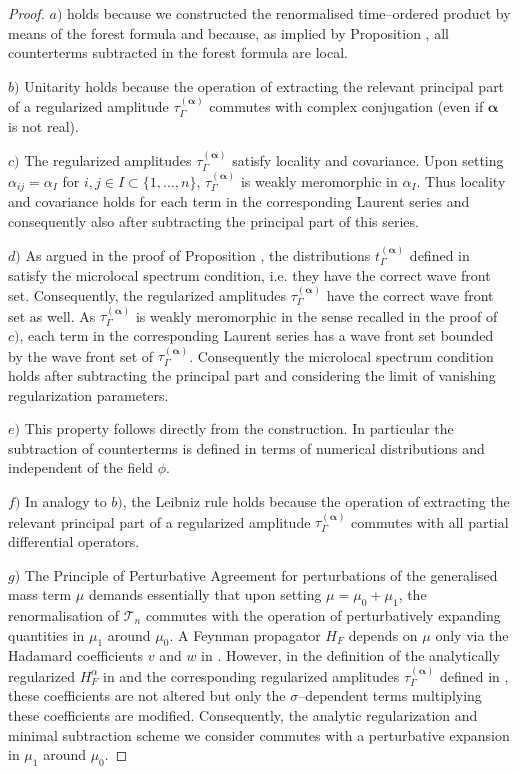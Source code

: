 \documentclass[11pt]{book}
\newcommand{\com}[1]{{\color{red}\bf #1}}
\newcommand{\alphabd}{\boldsymbol{\alpha}}
\theoremstyle{break}
\begin{document}
{\com{
\begin{proof}





$a)$ holds because we constructed the renormalised time--ordered product by means of the forest formula %
and because, as implied by Proposition %
, all counterterms subtracted in the forest formula are local.

$b)$ Unitarity holds because the operation of extracting the relevant principal part of a regularized amplitude $\tau^{(\alphabd)}_\Gamma$ commutes with complex conjugation (even if $\alphabd$ is not real).

$c)$ The regularized amplitudes $\tau^{(\alphabd)}_\Gamma$ satisfy locality and covariance. Upon setting $\alpha_{ij}=\alpha_I$ for $i,j\in I\subset \{1,\dots,n\}$, $\tau^{(\alphabd)}_\Gamma$ is weakly meromorphic in $\alpha_I$. Thus locality and covariance holds for each term in the corresponding Laurent series and consequently also after subtracting the principal part of this series.

$d)$ As argued in the proof of Proposition %
, the distributions $t^{(\alphabd)}_\Gamma$ defined in %
satisfy the microlocal spectrum condition, i.e. they have the correct wave front set. Consequently, the regularized amplitudes $\tau^{(\alphabd)}_\Gamma$ have the correct wave front set as well. As $\tau^{(\alphabd)}_\Gamma$ is weakly meromorphic in the sense recalled in the proof of $c)$, each term in the corresponding Laurent series has a wave front set bounded by the wave front set of $\tau^{(\alphabd)}_\Gamma$. Consequently the microlocal spectrum condition holds after subtracting the principal part and considering the limit of vanishing regularization parameters.

$e)$ This property follows directly from the construction. In particular the subtraction of counterterms is defined in terms of numerical distributions and independent of the field $\phi$.

$f)$ In analogy to $b)$, the Leibniz rule holds because the operation of extracting the relevant principal part of a regularized amplitude $\tau^{(\alphabd)}_\Gamma$ commutes with all partial differential operators.

$g)$ The Principle of Perturbative Agreement for perturbations of the generalised mass term $\mu$ demands essentially that upon setting $\mu=\mu_0 + \mu_1$, the renormalisation of $\mathcal{T}_n$ commutes with the operation of perturbatively expanding quantities in $\mu_1$ around $\mu_0$. A Feynman propagator $H_F$ depends on $\mu$ only via the Hadamard coefficients $v$ and $w$ in %
. However, in the definition of the analytically regularized $H^{\alpha}_F$ in %
and the corresponding regularized amplitudes $\tau^{(\alphabd)}_\Gamma$ defined in %
, these coefficients are not altered but only the $\sigma$--dependent terms multiplying these coefficients are modified. Consequently, the analytic regularization and minimal subtraction scheme we consider commutes with a perturbative expansion in $\mu_1$ around $\mu_0$.


\end{proof}}}
\end{document}

